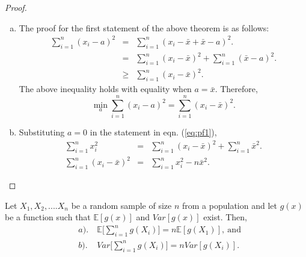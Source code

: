 \documentclass[a4paper,english,12pt]{article}
\begin{document}
\begin{proof}
\begin{enumerate}[a)]
\item{ 
The proof for the first statement of the above theorem is as follows:
\begin{eqnarray} \label{eq:pf1}
\sum_{i=1}^{n} (x_i - a)^2 &=& \sum_{i=1}^{n} (x_i - \bar{x} + \bar{x} - a)^2. \nonumber \\
&=& \sum_{i=1}^{n} (x_i - \bar{x})^2 + \sum_{i=1}^{n} (\bar{x} - a)^2.  \\ \nonumber
&\geq& \sum_{i=1}^{n} (x_i - \bar{x})^2.
\end{eqnarray}
The above inequality holds with equality when $a = \bar{x}$. Therefore,
\begin{equation}
 \min_{a} \sum_{i=1}^{n} (x_i - a)^2 = \sum_{i=1}^{n} (x_i - \bar{x})^2.
\end{equation}
}
\item{
Substituting $a = 0$ in the statement in eqn. (\ref{eq:pf1}),
\begin{eqnarray}
\sum_{i=1}^{n} x_i^2 &=& \sum_{i=1}^{n} (x_i - \bar{x})^2 + \sum_{i=1}^{n} \bar{x}^2.  \nonumber \\
\sum_{i=1}^{n} (x_i - \bar{x})^2 &=& \sum_{i=1}^{n} x_i^2 - n \bar{x}^2.
\end{eqnarray}
}
\end{enumerate}
\end{proof}
\begin{lem}
Let $X_1, X_2, .... X_n$ be a random sample of size $n$ from a population and let $g(x)$ be a function such that $\mathbb{E}[g(x)]$ and $Var[g(x)]$ exist. Then,
\begin{eqnarray}
&a).& ~\mathbb{E}\Big[ \sum_{i=1}^{n} g(X_i) \Big] = n \mathbb{E}[g(X_1)],~\mbox{and}\\
&b).& ~Var \Big[ \sum_{i=1}^{n} g(X_i) \Big] = n Var[g(X_i)].
\end{eqnarray}
\end{lem}
\end{document}

